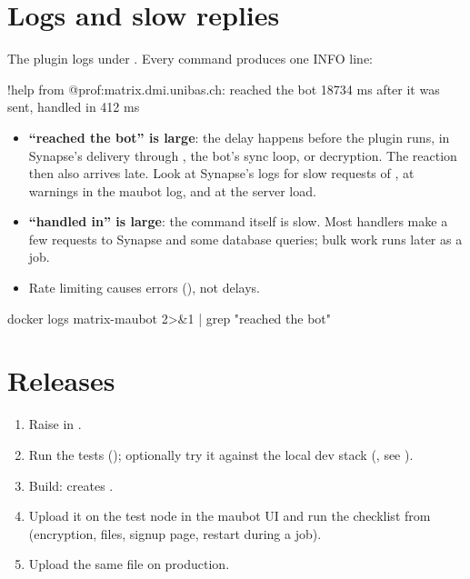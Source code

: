 \section{Logs and slow replies}
\label{sec:timing}

The plugin logs under . Every command produces one INFO line:

\begin{codefile}
!help from @prof:matrix.dmi.unibas.ch: reached the bot 18734 ms after it was sent, handled in 412 ms
\end{codefile}

\begin{itemize}
  \item \textbf{\enquote{reached the bot} is large}: the delay happens before the plugin runs,
        in Synapse's delivery through , the bot's sync loop, or decryption. The
        \robot{} reaction then also arrives late. Look at Synapse's logs for slow 
        requests of , at  warnings in the maubot log,
        and at the server load.
  \item \textbf{\enquote{handled in} is large}: the command itself is slow. Most handlers make a
        few requests to Synapse and some database queries; bulk work runs later as a job.
  \item Rate limiting causes errors (), not delays.
\end{itemize}

\begin{codefile}
docker logs matrix-maubot 2>&1 | grep "reached the bot"
\end{codefile}

\section{Releases}

\begin{enumerate}
  \item Raise  in .
  \item Run the tests (); optionally try it against the local dev stack
        (, see ).
  \item Build:  creates .
  \item Upload it on the test node in the maubot UI and run the checklist from
         (encryption, files, signup page, restart during a job).
  \item Upload the same file on production.
\end{enumerate}

